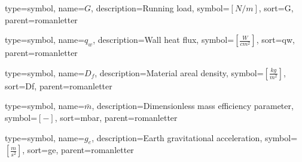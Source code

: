 {
type=symbol, %
name={\ensuremath{G}}, %
description={Running load}, %
symbol={$\left[N/m\right]$}, %
sort=G, %
parent=romanletter %
}

{
	type=symbol, %
	name={\ensuremath{q_{w}}}, %
	description={Wall heat flux}, %
	symbol={$\left[\frac{W}{cm^{2}}\right]$}, %
	sort=qw, %
	parent=romanletter %
}

{
type=symbol, %
name={\ensuremath{D_f}}, %
description={Material areal density}, %
symbol={$\left[\frac{kg}{m^2}\right]$}, %
sort=Df, %
parent=romanletter %
}

{
type=symbol, %
name={\ensuremath{\bar{m}}}, %
description={Dimensionless mass efficiency parameter}, %
symbol={$\left[-\right]$}, %
sort=mbar, %
parent=romanletter %
}

{
type=symbol, %
name={\ensuremath{g_{e}}}, %
description={Earth gravitational acceleration}, %
symbol={$\left[\frac{m}{s^2} \right]$}, %
sort=ge, %
parent=romanletter %
}

